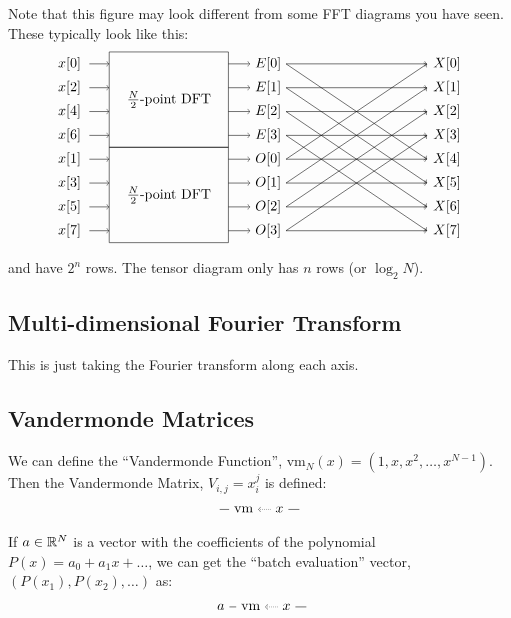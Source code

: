 Note that this figure may look different from some FFT diagrams you have seen.
These typically look like this:
\[
\begin{tikzpicture}
  \draw (0, -2.1) rectangle (3, .3) node[midway] {$\frac{N}{2}$-point DFT};
  \draw (0, -4.5) rectangle (3, -2.1) node[midway] {$\frac{N}{2}$-point DFT};

  \foreach \i in {0,2,4,6} {
    \node at (-1, - \i*0.3) {$x[\i]$};
    \draw[->] (-0.5, - \i*0.3) -- (0, - \i*0.3);
  }
  \foreach \i in {1,3,5,7} {
    \node at (-1, - \i*0.3 - 2.1) {$x[\i]$};
    \draw[->] (-0.5, - \i*0.3 - 2.1) -- (0, - \i*0.3 - 2.1);
  }
  \foreach \i in {0,1,2,3} {
    \node (E) at (4, - \i*0.6) {$E[\i]$};
    \draw[->] (3, - \i*0.6) -- (E.west);
    \draw[->] (E.east) -- (8, - \i*0.6);
    \draw[->] (E.east) -- (8, - \i*0.6 - 2.4);
  }
  \foreach \i in {0,1,2,3} {
    \node (O) at (4, - \i*0.6 - 2.4) {$O[\i]$};
    \draw[->] (3, - \i*0.6 - 2.4) -- (O.west);
    \draw[->] (O.east) -- (8, - \i*0.6);
    \draw[->] (O.east) -- (8, - \i*0.6 - 2.4);
  }
  \foreach \i in {0,...,7} {
    \node at (8.5, - \i*0.6) {$X[\i]$};
  }
\end{tikzpicture}
\]
and have $2^n$ rows.
The tensor diagram only has $n$ rows (or $\log_2 N$).

\subsection{Multi-dimensional Fourier Transform}
This is just taking the Fourier transform along each axis.

\subsection{Vandermonde Matrices}
We can define the ``Vandermonde Function'', $\mathrm{vm}_N(x) = (1, x, x^2, \dots, x^{N-1})$.
Then the Vandermonde Matrix, $V_{i,j}=x_i^j$ is defined:
\[
   \begin{tikzpicture}
      \node(vm) at (0,0) {vm};
      \node(x) at (.9,0) {$x$};
      \draw[densely dotted, ->] (x) -> (vm);
      \draw (x) -- ++(.5,0);
      \draw (vm) -- ++(-.6,0);
   \end{tikzpicture}
\]
If $a\in\mathbb R^N$ is a vector with the coefficients of the polynomial $P(x)=a_0 + a_1 x + \dots$, we can get the ``batch evaluation'' vector, $(P(x_1), P(x_2), \dots)$ as:
\[
   \begin{tikzpicture}
      \node(a) at (-.75,0) {$a$};
      \node(vm) at (0,0) {vm};
      \node(x) at (.9,0) {$x$};
      \draw[densely dotted, ->] (x) -> (vm);
      \draw (x) -- ++(.5,0);
      \draw (vm) -- (a);
   \end{tikzpicture}
\]

